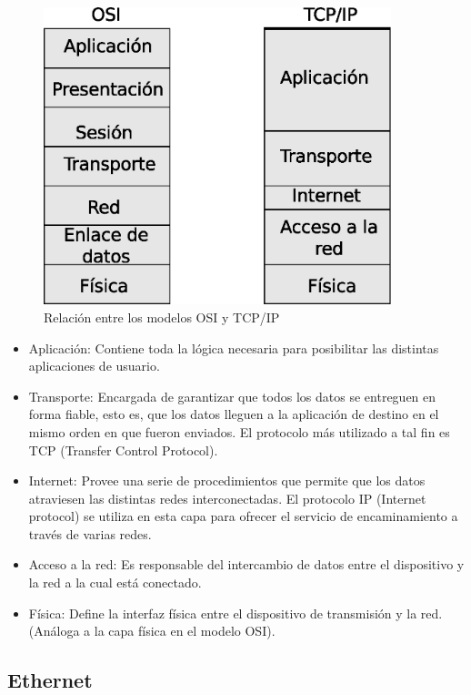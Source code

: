 \begin{figure}[h]
  \centering
	\includegraphics[width=0.90\textwidth]{2-sistema/graf/ositcp.eps}
  \caption{Relación entre los modelos OSI y TCP/IP}
  \label{fig:ositcp}
\end{figure}

\begin{itemize}
	\item Aplicación: Contiene toda la lógica necesaria para posibilitar las distintas aplicaciones de usuario.
	\item Transporte: Encargada de garantizar que todos los datos se entreguen en forma fiable, esto es, que los datos lleguen a la aplicación de destino en el mismo orden en que fueron enviados. El protocolo más utilizado a tal fin es TCP (Transfer Control Protocol).
	\item Internet: Provee una serie de procedimientos que permite que los datos atraviesen las distintas redes interconectadas. El protocolo IP (Internet protocol) se utiliza en esta capa para ofrecer el servicio de encaminamiento a través de varias redes.
	\item Acceso a la red: Es responsable del intercambio de datos entre el dispositivo y la red a la cual está conectado. 
	\item Física: Define la interfaz física entre el dispositivo de transmisión y la red. (Análoga a la capa física en el modelo OSI).
\end{itemize}

\subsection{Ethernet}

